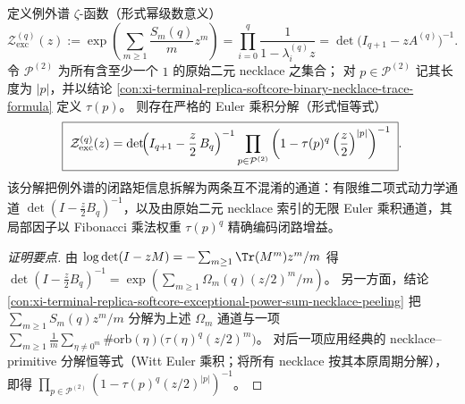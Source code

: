 







\begin{conclusion}\label{con:xi-terminal-replica-softcore-exceptional-spectrum-zeta-euler-product}
定义例外谱 \(\zeta\)-函数（形式幂级数意义）
\[
\mathcal Z_{\mathrm{exc}}^{(q)}(z)
:=\exp\!\left(\sum_{m\ge 1}\frac{S_m(q)}{m}z^m\right)
=\prod_{i=0}^{q}\frac{1}{1-\lambda_i^{(q)}z}
=\det\!\bigl(I_{q+1}-zA^{(q)}\bigr)^{-1}.
\]
令 \(\mathcal P^{(2)}\) 为所有含至少一个 \(1\) 的原始二元 necklace 之集合；
对 \(p\in\mathcal P^{(2)}\) 记其长度为 \(|p|\)，并以结论 \ref{con:xi-terminal-replica-softcore-binary-necklace-trace-formula} 定义 \(\tau(p)\)。
则存在严格的 Euler 乘积分解（形式恒等式）
\[
\boxed{\;
\mathcal Z_{\mathrm{exc}}^{(q)}(z)
=\det\!\Bigl(I_{q+1}-\frac z2\,B_q\Bigr)^{-1}
\prod_{p\in\mathcal P^{(2)}}\left(1-\tau(p)^q\left(\frac z2\right)^{|p|}\right)^{-1}\; } .
\]
该分解把例外谱的闭路矩信息拆解为两条互不混淆的通道：有限维二项式动力学通道 \(\det(I-\tfrac z2 B_q)^{-1}\)，以及由原始二元 necklace 索引的无限 Euler 乘积通道，其局部因子以 Fibonacci 乘法权重 \(\tau(p)^q\) 精确编码闭路增益。
\end{conclusion}
\begin{proof}[证明要点]
由 \(\log\det(I-zM)=-\sum_{m\ge 1}\Tr(M^m)z^m/m\) 得
\(
\det(I-\tfrac z2B_q)^{-1}=\exp(\sum_{m\ge 1}\Omega_m(q)(z/2)^m/m)
\)。
另一方面，结论 \ref{con:xi-terminal-replica-softcore-exceptional-power-sum-necklace-peeling} 把
\(
\sum_{m\ge 1}S_m(q)z^m/m
\)
分解为上述 \(\Omega_m\) 通道与一项
\(
\sum_{m\ge 1}\frac{1}{m}\sum_{\eta\ne 0^m}\#\mathrm{orb}(\eta)\bigl(\tau(\eta)^q(z/2)^m\bigr)
\)。
对后一项应用经典的 necklace--primitive 分解恒等式（Witt Euler 乘积；将所有 necklace 按其本原周期分解），即得 \(\prod_{p\in\mathcal P^{(2)}}(1-\tau(p)^q(z/2)^{|p|})^{-1}\)。
\end{proof}

\endinput
